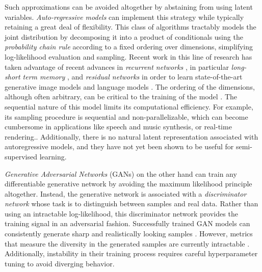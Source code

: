 \documentclass{article}
\begin{document}
Such approximations can be avoided altogether by abstaining from using latent variables. \emph{Auto-regressive models} \citep{frey1998graphical, bengio1999modeling, larochelle2011neural, DBLP:journals/corr/GermainGML15} can implement this strategy while typically retaining a great deal of flexibility. This class of algorithms tractably models the joint distribution by decomposing it into a product of conditionals using the \emph{probability chain rule} according to a fixed ordering over dimensions, simplifying log-likelihood evaluation and sampling. Recent work in this line of research has taken advantage of recent advances in \emph{recurrent networks} \citep{rumelhart1988learning}, in particular \emph{long-short term memory} \citep{DBLP:journals/neco/HochreiterS97}, and \emph{residual networks} \citep{DBLP:journals/corr/HeZR016, DBLP:journals/corr/HeZRS15} in order to learn state-of-the-art generative image models \citep{theis2015generative, oord2016pixel} and language models \citep{DBLP:journals/corr/JozefowiczVSSW16}.
The ordering of the dimensions, although often arbitrary, can be critical to the training of the model \citep{vinyals2015order}.
The sequential nature of this model limits its computational efficiency. For example, its sampling procedure is sequential and non-parallelizable, which can become cumbersome in applications like speech and music synthesis, or real-time rendering..
Additionally, there is no natural latent representation associated with autoregressive models, and they have not yet been shown to be useful for semi-supervised learning.

\emph{Generative Adversarial Networks} (GANs) \citep{DBLP:conf/nips/GoodfellowPMXWOCB14} on the other hand can train any differentiable generative network by avoiding the maximum likelihood principle altogether. Instead, the generative network is associated with a \emph{discriminator network} whose task is to distinguish between samples and real data. Rather than using an intractable log-likelihood, this discriminator network provides the training signal in an adversarial fashion. Successfully trained GAN models \citep{DBLP:conf/nips/GoodfellowPMXWOCB14, DBLP:conf/nips/DentonCSF15, DBLP:journals/corr/RadfordMC15} can consistently generate sharp and realistically looking samples \citep{DBLP:journals/corr/LarsenSW15}. However, metrics that measure the diversity in the generated samples are currently intractable \citep{DBLP:journals/corr/TheisOB15, gregor2016towards, im2016generating}. Additionally, instability in their training process \citep{DBLP:journals/corr/RadfordMC15} requires careful hyperparameter tuning to avoid diverging behavior.
\end{document}
